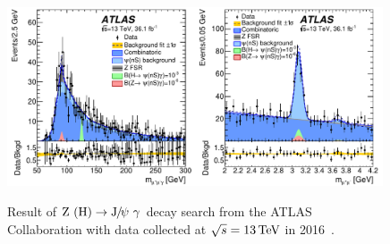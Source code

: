 \begin{figure}[!ht]
  \begin{center}  
    \includegraphics[width=0.99\textwidth]{Fig/fig_04a_ATLAS2016}\\
    \caption{Result of $\cPZ\ (\PH)\to\JPsi\ \gamma$ decay search from the ATLAS Collaboration with data collected at $\sqrt{s}=13\,\text{Te\hspace{-.08em}V}$ in 2016~\cite{Aaboud:2018txb}.\label{fig:ATLAS2016}}  
  \end{center}
\end{figure}
